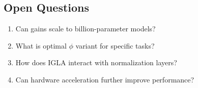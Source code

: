 \subsection*{Open Questions}

\begin{enumerate}
\item Can gains scale to billion-parameter models?
\item What is optimal $\phi$ variant for specific tasks?
\item How does IGLA interact with normalization layers?
\item Can hardware acceleration further improve performance?
\end{enumerate}

